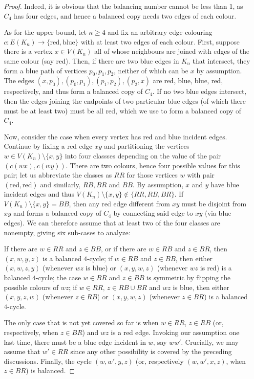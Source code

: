 \begin{proof}    
    Indeed, it is obvious that the balancing number cannot be less than 1, as $C_4$ has four edges, and hence a balanced copy needs two edges of each colour.

    As for the upper bound, let $n\geq 4$ and fix an arbitrary edge colouring $c\colon E(K_n)\to\{\text{red},\text{blue}\}$ with at least two edges of each colour.
    First, suppose there is a vertex $x\in V(K_n)$ all of whose neighbours are joined with edges of the same colour (say red).
    Then, if there are two blue edges in $K_n$ that intersect, they form a blue path of vertices $p_0,p_1,p_2$, neither of which can be $x$ by assumption.
    The edges $(x,p_0),(p_0,p_1),(p_1,p_2),(p_2,x)$ are red, blue, blue, red, respectively, and thus form a balanced copy of $C_4$.
    If no two blue edges intersect, then the edges joining the endpoints of two particular blue edges (of which there must be at least two) must be all red, which we use to form a balanced copy of $C_4$.
    
    Now, consider the case when every vertex has red and blue incident edges.
    Continue by fixing a red edge $xy$ and partitioning the vertices $w\in V(K_n)\setminus\{x,y\}$ into four classses depending on the value of the pair $(c(wx),c(wy))$.
    There are two colours, hence four possible values for this pair; let us abbreviate the classes as $RR$ for those vertices $w$ with pair $(\text{red},\text{red})$ and similarly, $RB,BR$ and $BB$.
    By assumption, $x$ and $y$ have blue incident edges and thus $V(K_n)\setminus\{x,y\}\notin\{RR,RB,BR\}$.
    If $V(K_n)\setminus\{x,y\}=BB$, then any red edge different from $xy$ must be disjoint from $xy$ and forms a balanced copy of $C_4$ by connecting said edge to $xy$ (via blue edges).
    We can therefore assume that at least two of the four classes are nonempty, giving six sub-cases to analyze:

    If there are $w\in RR$ and $z\in BB$, or if there are $w\in RB$ and $z\in BR$, then $(x,w,y,z)$ is a balanced $4$-cycle; if $w\in RB$ and $z\in BB$, then either $(x,w,z,y)$ (whenever $wz$ is blue) or $(x,y,w,z)$ (whenever $wz$ is red) is a balanced $4$-cycle; the case $w\in BR$ and $z\in BB$ is symmetric by flipping the possible colours of $wz$; if $w\in RR$, $z\in RB\cup BR$ and $wz$ is blue, then either $(x,y,z,w)$ (whenever $z\in RB$) or $(x,y,w,z)$ (whenever $z\in BR$) is a balanced $4$-cycle.
    
    The only case that is not yet covered so far is when $w\in RR$, $z\in RB$ (or, respectively, when $z\in BR$) and $wz$ is a red edge.
    Invoking our assumption one last time, there must be a blue edge incident in $w$, say $ww'$.
    Crucially, we may assume that $w'\in RR$ since any other possibility is covered by the preceding discussions.
    Finally, the cycle $(w,w',y,z)$ (or, respectively $(w,w',x,z)$, when $z\in BR$) is balanced.
\end{proof}

